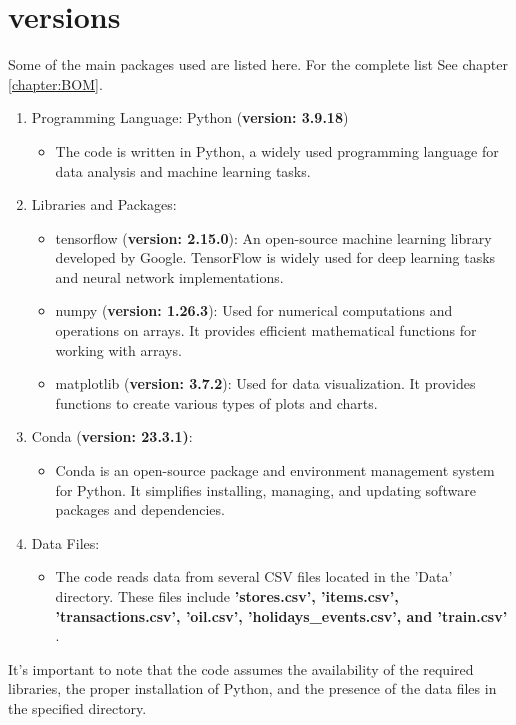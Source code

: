 \section{versions}

Some of the main packages used are listed here. For the complete list See chapter \ref{chapter:BOM}.

\begin{enumerate}
	\item Programming Language: Python (\textbf{version: 3.9.18})
	\begin{itemize}
		\item The code is written in Python, a widely used programming language for data analysis and machine learning tasks.
	\end{itemize}
	\item Libraries and Packages:
	\begin{itemize}
		\item tensorflow (\textbf{version: 2.15.0}): An open-source machine learning library developed by Google. TensorFlow is widely used for deep learning tasks and neural network implementations.
		\item numpy (\textbf{version: 1.26.3}): Used for numerical computations and operations on arrays. It provides efficient mathematical functions for working with arrays.
		\item matplotlib (\textbf{version: 3.7.2}): Used for data visualization. It provides functions to create various types of plots and charts.
	\end{itemize}
	\item Conda (\textbf{version: 23.3.1)}:
	\begin{itemize}
		\item Conda is an open-source package and environment management system for Python. It simplifies installing, managing, and updating software packages and dependencies.
	\end{itemize}
	\item Data Files:
	\begin{itemize}
		\item The code reads data from several CSV files located in the 'Data' directory. These files include \textbf{'stores.csv', 'items.csv', 'transactions.csv', 'oil.csv', 'holidays\_events.csv', and 'train.csv'} .
	\end{itemize}
\end{enumerate}

It's important to note that the code assumes the availability of the required libraries, the proper installation of Python, and the presence of the data files in the specified directory. 


